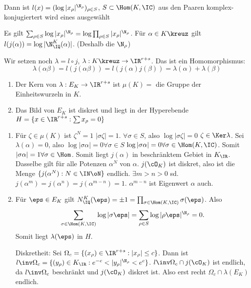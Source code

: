 \begin{Beispiel}
\begin{itemize}
\begin{Definition}
Dann ist $l(x)=(\log|x_\rho|^{\N_\rho})_{\rho\in S}$, $S\subset\Hom(K,\IC)$ aus den Paaren komplex-konjugiertert wird eines ausgewählt
  \end{Definition}
 
  Es gilt $\sum_{\rho\in S}\log|x_\rho|^{\N_\rho}=\log\prod_{\rho\in S} |x_\rho|^{\N_\rho}$. Für $\alpha\in K\kreuz$ gilt $l(j(\alpha))=\log |\N_\IQ^K(\alpha)|$. (Deshalb die $\N_\rho$)
  
  Wir setzen noch $\lambda=l\circ j$, $\lambda: K\kreuz \rightarrow \IR^{r+s}$. Das ist ein Homomorphismus:
  \[ \lambda(\alpha\beta)=l(j(\alpha\beta))=l(j(\alpha)j(\beta))=\lambda(\alpha)+\lambda(\beta)\]
  \end{itemize}
\end{Beispiel}

\begin{Fakt}
 \begin{enumerate}
  \item Der Kern von $\lambda:E_K\rightarrow \IR^{r+s}$ ist $\mu(K)=$ die Gruppe der Einheitswurzeln in $K$.
  \item Das Bild von $E_K$ ist diskret und liegt in der Hyperebende $H=\{x\in\IR^{r+s} : \sum x_\rho = 0\}$
 \end{enumerate}
\end{Fakt}

\begin{Beweis}
 \begin{enumerate}
  \item Für $\zeta\in\mu(K)$ ist $\zeta^N=1$ \folge $|\sigma\zeta|=1$. $\forall\sigma\in S$, also $\log|\sigma\zeta|=0$ \folge $\zeta\in\Ker\lambda$. Sei $\lambda(\alpha)=0$, also $\log|\sigma\alpha|=0 \forall \sigma \in S$ \folge $\log|\sigma\alpha|=0 \forall \sigma\in\Hom(K,\IC)$. Somit $|\sigma\alpha|=1 \forall \sigma\in\Hom$. Somit liegt $j(\alpha)$ in beschränktem Gebiet in $K_\IR$. Dasselbe gilt für alle Potenzen $\alpha^N$ von $\alpha$. $j(\cO_K)$ ist diskret, also ist die Menge $\{j(\alpha^N): N\in\IN\oN \}$ endlich.
  $\exists m>n>0$ sd. $j(\alpha^m)=j(\alpha^n)=j(\alpha^{m-n})=1$. \folge $\alpha^{m-n}$ ist Eigenwert \folge $\alpha$ auch.
  \item Für $\eps\in E_K$ gilt $N_\IQ^K(\eps)=\pm 1=\prod_{\sigma\in\Hom(K,\IC)} \sigma(\eps)$. Also 
  \[ \sum_{\sigma\in\Hom(K,\IC)} \log |\sigma\eps| = \sum_{\rho\in S} \log|\rho\eps|^{\N_\rho}=0.\]
  Somit liegt $\lambda(\eps)$ in $H$.
  
  Diskretheit: Sei $\Omega_c=\{(x_\rho)\in\IR^{r+s} : |x_\rho|\leq c \}$. Dann ist $l\inv\Omega_c=\{(y_\rho)\in K_\IR : e^{-c}<|y_\rho|^{\N_\rho}<e^c \}$. $l\inv\Omega_c\cap j(\cO_K)$ ist endlich, da $l\inv\Omega_c$ beschränkt und $j(\cO_K)$ diskret ist. Also erst recht $\Omega_c\cap\lambda(E_K)$ endlich.
 \end{enumerate}
\end{Beweis}


